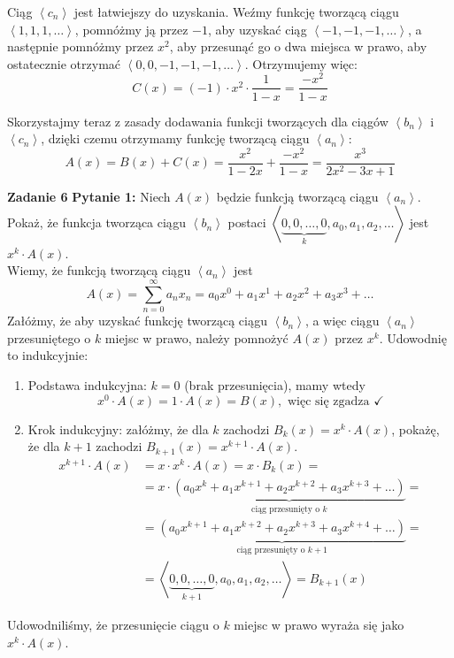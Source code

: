\documentclass[a4paper,12pt]{article}
\newcommand{\sequence}[1]{\left\langle #1 \right\rangle} %
\begin{document}
\noindent Ciąg $\sequence{c_n}$ jest łatwiejszy do uzyskania. Weźmy funkcję tworzącą ciągu $\sequence{1, 1, 1, \ldots}$, pomnóżmy ją przez $-1$, aby uzyskać ciąg $\sequence{-1, -1, -1, \ldots}$, a następnie pomnóżmy przez $x^2$, aby przesunąć go o dwa miejsca w prawo, aby ostatecznie otrzymać $\sequence{0, 0, -1, -1, -1, \ldots}$. Otrzymujemy więc:
\[ C(x) = (-1) \cdot x^2 \cdot \frac{1}{1 - x} = \frac{-x^2}{1 - x} \]

\noindent Skorzystajmy teraz z zasady dodawania funkcji tworzących dla ciągów $\sequence{b_n}$ i $\sequence{c_n}$, dzięki czemu otrzymamy funkcję tworzącą ciągu $\sequence{a_n}$:
\[ A(x) = B(x) + C(x) = \frac{x^2}{1 - 2x} + \frac{-x^2}{1 - x} = \frac{x^3}{2x^2 - 3x + 1} \]

\newpage
\noindent \textbf{Zadanie 6} \newline
\textbf{Pytanie 1:} Niech $A(x)$ będzie funkcją tworzącą ciągu $\sequence{a_n}$. Pokaż, że funkcja tworząca ciągu $\sequence{b_n}$ postaci $\sequence{\underbrace{0, 0, \ldots, 0}_{k}, a_0, a_1, a_2, \ldots}$ jest $x^k \cdot A(x)$. \\

\noindent Wiemy, że funkcją tworzącą ciągu $\sequence{a_n}$ jest 
\[ A(x) = \sum\limits_{n=0}^{\infty} a_n x_n = a_0 x^0 + a_1 x^1 + a_2 x^2 + a_3 x^3 + \ldots \]
Załóżmy, że aby uzyskać funkcję tworzącą ciągu $\sequence{b_n}$, a więc ciągu $\sequence{a_n}$ przesuniętego o $k$ miejsc w prawo, należy pomnożyć $A(x)$ przez $x^k$. Udowodnię to indukcyjnie:
\begin{enumerate}
	\item Podstawa indukcyjna: $k = 0$ (brak przesunięcia), mamy wtedy
    \[ x^0 \cdot A(x) = 1 \cdot A(x) = B(x), \text{ więc się zgadza } \checkmark \]
	\item Krok indukcyjny: załóżmy, że dla $k$ zachodzi $B_k(x) = x^k \cdot A(x)$, pokażę, że dla $k+1$ zachodzi $B_{k+1}(x) = x^{k+1} \cdot A(x)$.
	\begin{align*}
        x^{k+1} \cdot A(x)  &= x \cdot x^k \cdot A(x) = x \cdot B_k(x) = \\
                            &= x \cdot \underbrace{\left(a_0 x^k + a_1 x^{k+1} + a_2 x^{k+2} + a_3 x^{k+3} + \ldots\right)}_{\text{ciąg przesunięty o } k} = \\
                            &= \underbrace{\left(a_0 x^{k+1} + a_1 x^{k+2} + a_2 x^{k+3} + a_3 x^{k+4} + \ldots\right)}_{\text{ciąg przesunięty o } k + 1} = \\
                            &= \sequence{\underbrace{0, 0, \ldots, 0}_{k + 1}, a_0, a_1, a_2, \ldots} = B_{k+1}(x)
    \end{align*}
\end{enumerate}
Udowodniliśmy, że przesunięcie ciągu o $k$ miejsc w prawo wyraża się jako $x^k \cdot A(x)$. \\
\end{document}
